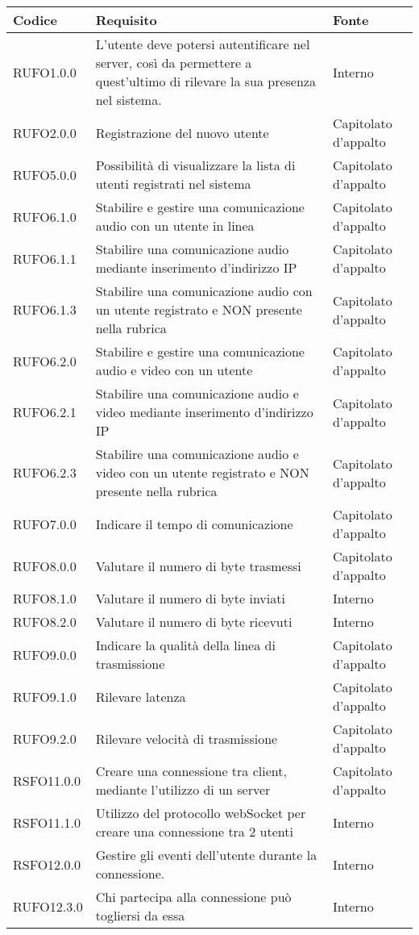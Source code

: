 \begin{center}
\begin{longtable}{lp{}l}
\toprule Codice & Requisito & Fonte\\
\midrule
RUFO1.0.0 & L'utente deve potersi autentificare nel server, così da permettere a quest'ultimo di rilevare la sua presenza nel sistema. & Interno \\
RUFO2.0.0 & Registrazione del nuovo utente & Capitolato d'appalto \\
RUFO5.0.0 & Possibilità di visualizzare la lista di utenti registrati nel sistema & Capitolato d'appalto \\
RUFO6.1.0 & Stabilire e gestire una comunicazione audio con un utente in linea & Capitolato d'appalto \\
RUFO6.1.1 & Stabilire una comunicazione audio mediante inserimento d'indirizzo IP & Capitolato d'appalto \\
RUFO6.1.3 & Stabilire una comunicazione audio con un utente registrato e NON presente nella rubrica & Capitolato d'appalto \\
RUFO6.2.0 & Stabilire e gestire  una comunicazione audio e video con un utente & Capitolato d'appalto \\
RUFO6.2.1 & Stabilire una comunicazione audio e video mediante inserimento d'indirizzo IP & Capitolato d'appalto \\
RUFO6.2.3 & Stabilire una comunicazione audio e video con un utente registrato e NON presente nella rubrica & Capitolato d'appalto \\
RUFO7.0.0 & Indicare il tempo di comunicazione & Capitolato d'appalto \\
RUFO8.0.0 & Valutare il numero di byte trasmessi & Capitolato d'appalto \\
RUFO8.1.0 & Valutare il numero di byte inviati & Interno \\
RUFO8.2.0 & Valutare il numero di byte ricevuti & Interno \\
RUFO9.0.0 & Indicare la qualità della linea di trasmissione & Capitolato d'appalto \\
RUFO9.1.0 & Rilevare latenza & Capitolato d'appalto \\
RUFO9.2.0 & Rilevare velocità di trasmissione & Capitolato d'appalto \\
RSFO11.0.0 & Creare una connessione tra client, mediante l'utilizzo di un server & Capitolato d'appalto \\
RSFO11.1.0 & Utilizzo del protocollo webSocket per creare una connessione tra 2 utenti & Interno \\
RSFO12.0.0 & Gestire gli eventi dell'utente durante la connessione. & Interno \\
RUFO12.3.0 & Chi partecipa alla connessione può togliersi da essa & Interno \\
\bottomrule
\end{longtable}
\end{center}

